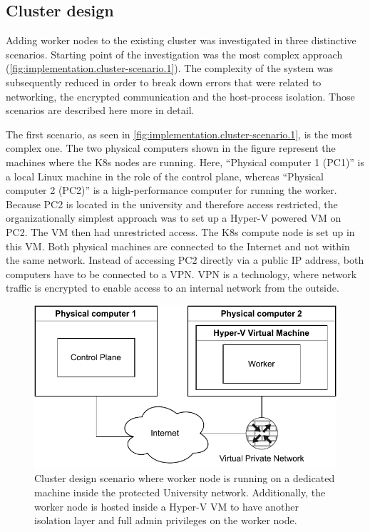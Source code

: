 \subsection{Cluster design}
Adding worker nodes to the existing cluster was investigated in three distinctive scenarios. Starting point of the investigation was the most complex approach (\autoref{fig:implementation.cluster-scenario.1}). The complexity of the system was subsequently reduced in order to break down errors that were related to networking, the encrypted communication and the host-process isolation.
Those scenarios are described here more in detail.

The first scenario, as seen in \autoref{fig:implementation.cluster-scenario.1}, is the most complex one. The two physical computers shown in the figure represent the machines where the \ac{K8s} nodes are running. Here, \enquote{Physical computer 1 (PC1)} is a local Linux machine in the role of the control plane, whereas \enquote{Physical computer 2 (PC2)} is a high-performance computer for running the worker. Because PC2 is located in the university and therefore access restricted, the organizationally simplest approach was to set up a Hyper-V powered \ac{VM} on PC2. The \ac{VM} then had unrestricted access. The \ac{K8s} compute node is set up in this \ac{VM}.
Both physical machines are connected to the Internet and not within the same network. Instead of accessing PC2 directly via a public \ac{IP} address, both computers have to be connected to a \ac{VPN}. \ac{VPN} is a technology, where network traffic is encrypted to enable access to an internal network from the outside.

\begin{figure}[ht]
	\centering
	\includegraphics[width=.8\textwidth]{Figures/Cluster-scenarios-1.pdf}
	\caption{Cluster design scenario where worker node is running on a dedicated machine inside the protected University network. Additionally, the worker node is hosted inside a Hyper-V \ac{VM} to have another isolation layer and full admin privileges on the worker node.}
	\label{fig:implementation.cluster-scenario.1}
\end{figure}

